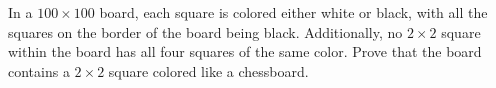 \begin{problem}
    In a $100 \times 100$ board, each square is colored either white or black, with all the squares on the border of the board being black. Additionally, no $2 \times 2$ square within the board has all four squares of the same color. Prove that the board contains a $2 \times 2$ square colored like a chessboard.
    \label{18ARGTST3}
\end{problem}
